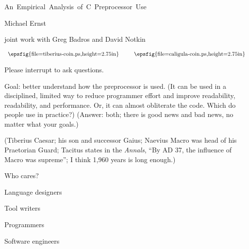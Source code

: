 \documentclass{slides}
\def\slidetitle#1{\begin{center}\large #1 \end{center}}
\begin{document}
\partopsep 0pt
\topsep 0pt

\begin{slide}
\slidetitle{\mbox{\hspace{-36pt}An Empirical Analysis of C Preprocessor Use}}
\vspace{.3in}
\centerline{Michael Ernst}
\vspace{.3in}
\centerline{joint work with Greg Badros and David Notkin}

  $$
  \begin{array}{c}
    \mbox{\epsfig{file=tiberius-coin.ps,height=2.75in}}
  \end{array}
  \mbox{~~~~~}
  \begin{array}{c}
    \mbox{\epsfig{file=caligula-coin.ps,height=2.75in}}
  \end{array}
  $$

\end{slide}

\begin{note}
Please interrupt to ask questions.

Goal: better understand how the preprocessor is used.  (It can be used in a
disciplined, limited way to reduce programmer effort and improve
readability, readability, and performance.   Or, it can almost obliterate
the code.  Which do people use in practice?)  (Answer: both; there is good
news and bad news, no matter what your goals.)

(Tiberius Caesar; his son and successor Gaius; 
Naevius Macro was head of his Praetorian Guard;
Tacitus states in the {\em Annals}, ``By AD 37, the influence of Macro was
supreme''; I think 1,960 years is long enough.)

\end{note}

\begin{slide}
\slidetitle{Who cares?}

Language designers

Tool writers

Programmers

Software engineers
\end{slide}
\end{document}
